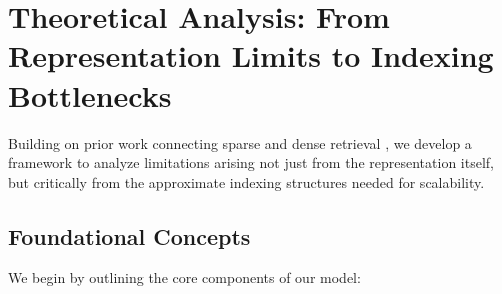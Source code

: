 \documentclass[manuscript]{acmart}
\begin{document}
\section{Theoretical Analysis: From Representation Limits to Indexing Bottlenecks}
Building on prior work connecting sparse and dense retrieval \cite{tay2020sparse}, we develop a framework to analyze limitations arising not just from the representation itself, but critically from the approximate indexing structures needed for scalability.

\subsection{Foundational Concepts} %

We begin by outlining the core components of our model:
\end{document}
